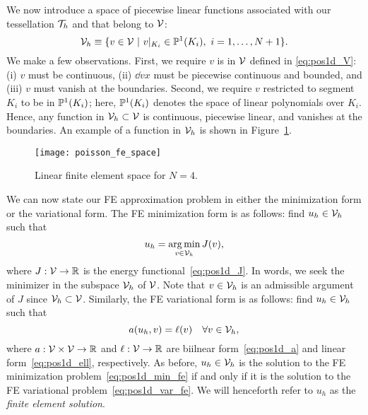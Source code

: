 We now introduce a space of piecewise linear functions associated with our tessellation $\mathcal{T}_h$ and that belong to $\mathcal{V}$:
\begin{equation}
  \mathcal{V}_h \equiv \{ v \in \mathcal{V} \ | \ v|_{K_i} \in \mathbb{P}^1(K_i), \ i = 1,\dots,N+1\}.
  \label{eq:pos1d_Vh}
\end{equation}
We make a few observations.  First, we require $v$ is in $\mathcal{V}$ defined in \eqref{eq:pos1d_V}: (i) $v$ must be continuous, (ii) $\dd{v}{x}$ must be piecewise continuous and bounded, and (iii) $v$ must vanish at the boundaries.  Second, we require $v$ restricted to segment $K_i$ to be in $\mathbb{P}^1(K_i)$; here, $\mathbb{P}^1(K_i)$ denotes the space of linear polynomials over $K_i$.  Hence, any function in $\mathcal{V}_h \subset \mathcal{V}$ is continuous, piecewise linear, and vanishes at the boundaries. An example of a function in $\mathcal{V}_h$ is shown in Figure~\ref{fig:pos1d_fe_space}.

\begin{figure}
  \centering
  \texttt{[image: poisson\_fe\_space]}
  \caption{Linear finite element space for $N = 4$.}
  \label{fig:pos1d_fe_space}
\end{figure}

We can now state our FE approximation problem in either the minimization form or the variational form.  The FE minimization form is as follows: find $u_h \in \mathcal{V}_h$ such that
\begin{equation}
  u_h = \operatorname*{arg\,min}_{v \in \mathcal{V}_h} J(v),
  \label{eq:pos1d_min_fe}
\end{equation}
where $J: \mathcal{V} \to \mathbb{R}$ is the energy functional~\eqref{eq:pos1d_J}. In words, we seek the minimizer in the subspace $\mathcal{V}_h$ of $\mathcal{V}$.  Note that $v \in \mathcal{V}_h$ is an admissible argument of $J$ since $\mathcal{V}_h \subset \mathcal{V}$. Similarly, the FE variational form is as follows: find $u_h \in \mathcal{V}_h$ such that
\begin{equation}
  a(u_h,v) = \ell(v) \quad \forall v \in \mathcal{V}_h,
  \label{eq:pos1d_var_fe}
\end{equation}
where $a: \mathcal{V} \times \mathcal{V} \to \mathbb{R}$ and $\ell: \mathcal{V} \to \mathbb{R}$ are biilnear form~\eqref{eq:pos1d_a} and linear form~\eqref{eq:pos1d_ell}, respectively.  As before, $u_h \in \mathcal{V}_h$ is the solution to the FE minimization problem~\eqref{eq:pos1d_min_fe} if and only if it is the solution to the FE variational problem~\eqref{eq:pos1d_var_fe}. We will henceforth refer to $u_h$ as the \emph{finite element solution}.


